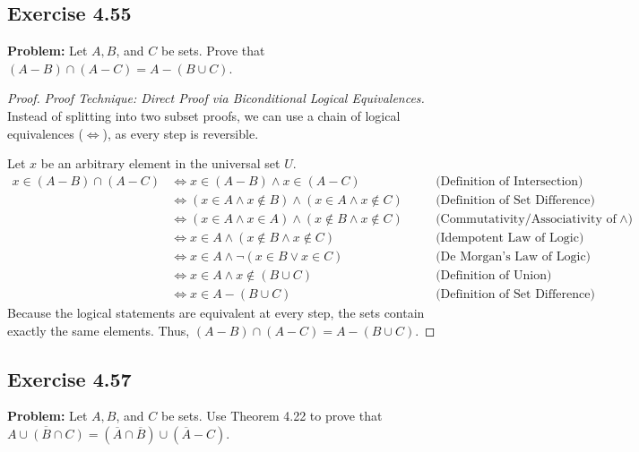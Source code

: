 \documentclass[11pt, a4paper]{article}
\theoremstyle{definition}
\theoremstyle{remark}
\begin{document}
\subsection{Exercise 4.55}
\textbf{Problem:} Let $A, B$, and $C$ be sets. Prove that $(A - B) \cap (A - C) = A - (B \cup C)$.

\begin{proof}
\textit{Proof Technique: Direct Proof via Biconditional Logical Equivalences.}
Instead of splitting into two subset proofs, we can use a chain of logical equivalences ($\iff$), as every step is reversible.

Let $x$ be an arbitrary element in the universal set $U$.
\begin{align*}
    x \in (A - B) \cap (A - C) &\iff x \in (A - B) \land x \in (A - C) \quad &&\text{(Definition of Intersection)} \\
    &\iff (x \in A \land x \notin B) \land (x \in A \land x \notin C) \quad &&\text{(Definition of Set Difference)} \\
    &\iff (x \in A \land x \in A) \land (x \notin B \land x \notin C) \quad &&\text{(Commutativity/Associativity of $\land$)} \\
    &\iff x \in A \land (x \notin B \land x \notin C) \quad &&\text{(Idempotent Law of Logic)} \\
    &\iff x \in A \land \neg(x \in B \lor x \in C) \quad &&\text{(De Morgan's Law of Logic)} \\
    &\iff x \in A \land x \notin (B \cup C) \quad &&\text{(Definition of Union)} \\
    &\iff x \in A - (B \cup C) \quad &&\text{(Definition of Set Difference)}
\end{align*}
Because the logical statements are equivalent at every step, the sets contain exactly the same elements. Thus, $(A - B) \cap (A - C) = A - (B \cup C)$.
\end{proof}

\subsection{Exercise 4.57}
\textbf{Problem:} Let $A, B$, and $C$ be sets. Use Theorem 4.22 to prove that $\overline{A \cup (B \cap C)} = (\overline{A} \cap \overline{B}) \cup (\overline{A} - C)$.
\end{document}
